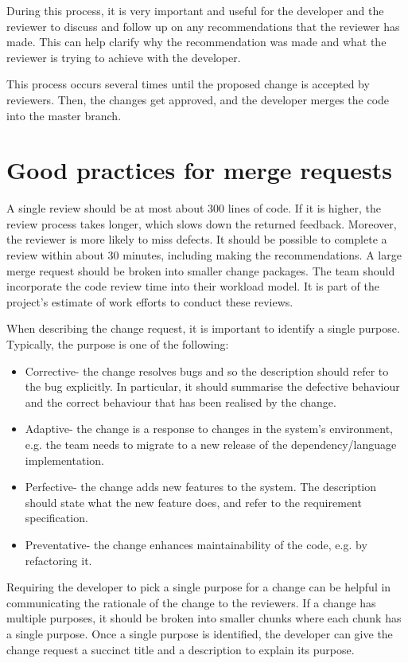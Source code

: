 \documentclass[a4paper, openany]{memoir}
\begin{document}
During this process, it is very important and useful for the developer and the reviewer to discuss and follow up on any recommendations that the reviewer has made. This can help clarify why the recommendation was made and what the reviewer is trying to achieve with the developer. 

This process occurs several times until the proposed change is accepted by reviewers. Then, the changes get approved, and the developer merges the code into the master branch.

\section{Good practices for merge requests}
A single review should be at most about 300 lines of code. If it is higher, the review process takes longer, which slows down the returned feedback. Moreover, the reviewer is more likely to miss defects. It should be possible to complete a review within about 30 minutes, including making the recommendations. A large merge request should be broken into smaller change packages. The team should incorporate the code review time into their workload model. It is part of the project's estimate of work efforts to conduct these reviews.

When describing the change request, it is important to identify a single purpose. Typically, the purpose is one of the following:
\begin{itemize}
    \item Corrective- the change resolves bugs and so the description should refer to the bug explicitly. In particular, it should summarise the defective behaviour and the correct behaviour that has been realised by the change.
    \item Adaptive- the change is a response to changes in the system's environment, e.g. the team needs to migrate to a new release of the dependency/language implementation.
    \item Perfective- the change adds new features to the system. The description should state what the new feature does, and refer to the requirement specification.
    \item Preventative- the change enhances maintainability of the code, e.g. by refactoring it.
\end{itemize}

Requiring the developer to pick a single purpose for a change can be helpful in communicating the rationale of the change to the reviewers. If a change has multiple purposes, it should be broken into smaller chunks where each chunk has a single purpose. Once a single purpose is identified, the developer can give the change request a succinct title and a description to explain its purpose. 
\end{document}
